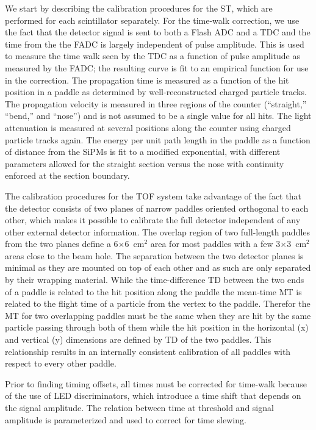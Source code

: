 We start by describing the calibration procedures for the ST, which are performed for each scintillator separately.
For the time-walk correction, we use the fact that the detector signal is sent to both a Flash ADC and a TDC and the time from the the FADC is largely independent of pulse amplitude. This is used to measure the time walk seen by the TDC as a function of pulse amplitude as measured by the FADC; the resulting curve is fit to an empirical function for use in the correction. The propagation time is measured as a function of the hit position in a paddle as determined by well-reconstructed charged particle tracks. The propagation velocity is measured in three regions of the counter (``straight,'' ``bend,'' and ``nose'') and is not assumed to be a single value for all hits. The light attenuation is measured at several positions along the counter using charged particle tracks again. The energy per unit path length in the paddle as a function of distance from the SiPMs is fit to a modified exponential, with different parameters allowed for the straight section versus the nose with continuity enforced at the section boundary.

The calibration procedures for the TOF system take advantage of the fact that the detector consists of two
planes of narrow paddles oriented orthogonal to each other, which makes it possible to calibrate the full detector independent
of any other external detector information. The overlap region of two full-length paddles from the two planes define
a 6$\times$6~cm$^2$ area for most paddles with a few 3$\times$3~cm$^2$ areas close to the beam hole. The separation between the two detector planes is minimal as they are mounted on top of each other and as such are only separated by their wrapping
material. While the time-difference TD between the two ends of a paddle is related to the hit position along the paddle
the mean-time MT is related to the flight time of a particle from the vertex to the paddle. Therefor the MT for two overlapping
paddles must be the same when they are hit by the same particle passing through both of them while the hit position in the horizontal (x) and vertical (y) dimensions are defined by TD of the two paddles. This relationship results in an internally consistent calibration of all paddles with respect to every other paddle.

Prior to finding timing offsets, all times must be corrected for time-walk because of the use of LED discriminators, which
introduce a time shift that depends on the signal amplitude. The relation between time at threshold and signal amplitude is parameterized and used to correct for time slewing.

